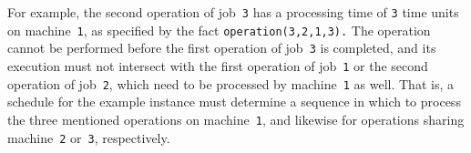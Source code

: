 \documentclass{tlp} %
\begin{document}
For example, the second operation of job~\lstinline{3} has a processing time of
\lstinline{3} time units on machine~\lstinline{1},
as specified by the fact
\lstinline{operation(3,}\linebreak[1]\lstinline{2,}\linebreak[1]\lstinline{1,3).}
The operation cannot be performed before the first operation of job~\lstinline{3}
is completed,
and its execution must not intersect with the first operation of job~\lstinline{1}
or the second operation of job~\lstinline{2},
which need to be processed by machine~\lstinline{1} as well.
That is, a schedule for the example instance must determine a sequence in which
to process the three mentioned operations on machine~\lstinline{1},
and likewise for operations sharing machine~\lstinline{2} or~\lstinline{3}, respectively.
\end{document}
